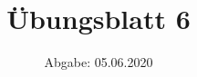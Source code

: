 

\subject{Computational Physics}
\title{Übungsblatt 6}
\date{%
  Abgabe: 05.06.2020
}



\maketitle
\thispagestyle{empty}
\newpage




%



